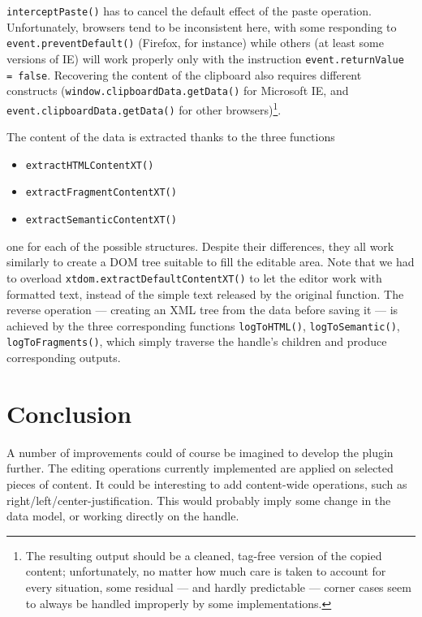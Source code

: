 \documentclass[11pt,a4paper]{article}
\begin{document}
\texttt{interceptPaste()} has to cancel the default effect of the paste operation. Unfortunately, browsers tend to be inconsistent here, with some responding to \verb?event.preventDefault()? (Firefox, for instance) while others (at least some versions of IE) will work properly only with the instruction \verb?event.returnValue = false?. Recovering the content of the clipboard also requires different constructs (\texttt{window.clipboardData.getData()} for Microsoft IE, and \texttt{event.clipboardData.getData()} for other browsers)\footnote{The resulting output should be a cleaned, tag-free version of the copied content; unfortunately, no matter how much care is taken to account for every situation, some residual --- and hardly predictable --- corner cases seem to always be handled improperly by some implementations.}. 


The content of the data is extracted thanks to the three functions

\begin{itemize}
\item \texttt{extractHTMLContentXT()}
\item \texttt{extractFragmentContentXT()}
\item \texttt{extractSemanticContentXT()}
\end{itemize}

\noindent one for each of the possible structures. Despite their differences, they all work similarly to create a DOM tree suitable to fill the editable area. Note that we had to overload \texttt{xtdom.extractDefaultContentXT()} to let the editor work with formatted text, instead of the simple text released by the original function. The reverse operation --- creating an XML tree from the data before saving it --- is achieved by the three corresponding functions \texttt{logToHTML()}, \texttt{logToSemantic()}, \texttt{logToFragments()}, which simply traverse the handle's children and produce corresponding outputs.



\section{Conclusion}

A number of improvements could of course be imagined to develop the plugin further. The editing operations currently implemented are applied on selected pieces of content. It could be interesting to add content-wide operations, such as right/left/center-justification. This would probably imply some change in the data model, or working directly on the handle. 
\end{document}
